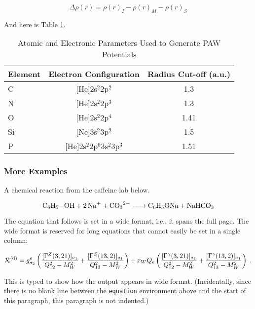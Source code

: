 \documentclass[letterpaper,amsmath,amssymb,prb,preprint,12pt]{revtex4-1}%
\begin{document}
\[\Delta\rho(r)=\rho(r)_{I}-\rho(r)_{M}-\rho(r)_{S}\]

And here is Table \ref{paw}.

\begin{table}[h]
\caption{Atomic and Electronic Parameters Used to Generate PAW Potentials}
\begin{tabular}{l@{\qquad}c@{\qquad}c}
\hline
Element&Electron Configuration&Radius Cut-off (a.u.)\\
\hline
\hline
C & [He]2s$^{2}$2p$^{2}$ & 1.3 \\
N & [He]2s$^{2}$2p$^{3}$ & 1.3 \\
O & [He]2s$^{2}$2p$^{4}$ & 1.41 \\
Si & [Ne]3s$^{2}$3p$^{2}$ & 1.5 \\
P & [He]2s$^{2}$2p$^{6}$3s$^{2}$3p$^{3}$ & 1.51 \\
\hline
\end{tabular}
\label{paw}
\end{table}

\subsubsection{More Examples}

A chemical reaction from the caffeine lab below.

\begin{widetext}
\begin{equation}
    \ce{C6H5-OH + 2Na+ + CO3^2- -> C6H5ONa + NaHCO3}
    \label{rxn}
\end{equation}
\end{widetext}
The equation that follows is set in a wide format, i.e., it spans the full page. 
The wide format is reserved for long equations
that cannot easily be set in a single column:
\begin{widetext}
\begin{equation}
{\cal R}^{(\text{d})}=
 g_{\sigma_2}^e
 \left(
   \frac{[\Gamma^Z(3,21)]_{\sigma_1}}{Q_{12}^2-M_W^2}
  +\frac{[\Gamma^Z(13,2)]_{\sigma_1}}{Q_{13}^2-M_W^2}
 \right)
 + x_WQ_e
 \left(
   \frac{[\Gamma^\gamma(3,21)]_{\sigma_1}}{Q_{12}^2-M_W^2}
  +\frac{[\Gamma^\gamma(13,2)]_{\sigma_1}}{Q_{13}^2-M_W^2}
 \right)\;. 
 \label{eq:wideeq}
\end{equation}
\end{widetext}
This is typed to show how the output appears in wide format.
(Incidentally, since there is no blank line between the \texttt{equation} environment above 
and the start of this paragraph, this paragraph is not indented.)
\end{document}
